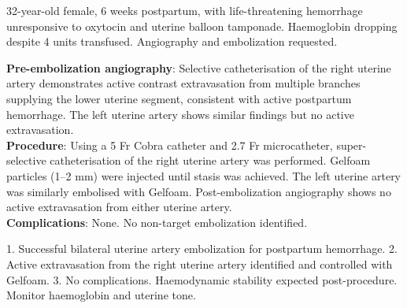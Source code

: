 \begin{testbox}[Indications:]
32-year-old female, 6 weeks postpartum, with life-threatening hemorrhage unresponsive to oxytocin and uterine balloon tamponade. Haemoglobin dropping despite 4 units transfused. Angiography and embolization requested.
\end{testbox}
\begin{refbox}[Findings:]
\textbf{Pre-embolization angiography}: Selective catheterisation of the right uterine artery demonstrates active contrast extravasation from multiple branches supplying the lower uterine segment, consistent with active postpartum hemorrhage. The left uterine artery shows similar findings but no active extravasation.\\
\textbf{Procedure}: Using a 5 Fr Cobra catheter and 2.7 Fr microcatheter, super-selective catheterisation of the right uterine artery was performed. Gelfoam particles (1--2 mm) were injected until stasis was achieved. The left uterine artery was similarly embolised with Gelfoam. Post-embolization angiography shows no active extravasation from either uterine artery.\\
\textbf{Complications}: None. No non-target embolization identified.
\end{refbox}
\begin{pearlbox}[Impression:]
1. Successful bilateral uterine artery embolization for postpartum hemorrhage.
2. Active extravasation from the right uterine artery identified and controlled with Gelfoam.
3. No complications. Haemodynamic stability expected post-procedure. Monitor haemoglobin and uterine tone.
\end{pearlbox}

\clearpage
